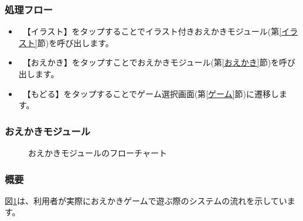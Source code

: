 \documentclass[a4j]{jarticle}
\begin{document}
\subsubsection*{処理フロー}
\begin{itemize}
\item　【イラスト】をタップすることでイラスト付きおえかきモジュール(第\ref{イラスト}節)を呼び出します。
\item　【おえかき】をタップすことでおえかきモジュール(第\ref{おえかき}節)を呼び出します。
\item　【もどる】をタップすることでゲーム選択画面(第\ref{ゲーム}節)に遷移します。
\end{itemize}

\newpage
\subsubsection{おえかきモジュール\label{おえかき}}
\begin{figure}[H]
    \begin{center}
    \caption {おえかきモジュールのフローチャート}
    \label{oekaki2}
    \end{center}
\end{figure}

\subsubsection*{概要}
図\ref{oekaki2}は、利用者が実際におえかきゲームで遊ぶ際のシステムの流れを示しています。
\end{document}
